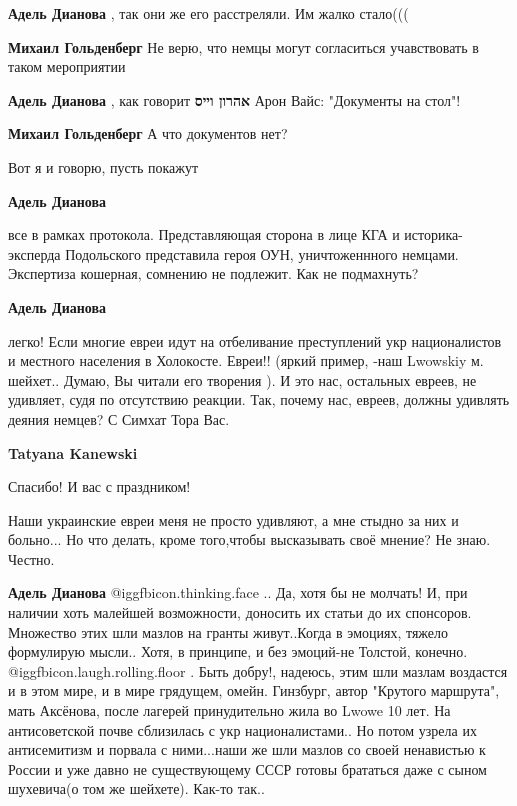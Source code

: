 \begin{itemize}
\begin{itemize} %
\textbf{Адель Дианова} , так они же его расстреляли. Им жалко стало(((

\textbf{Михаил Гольденберг} Не верю, что немцы могут согласиться учавствовать в таком мероприятии

\textbf{Адель Дианова} , как говорит \textbf{אהרון וייס} Арон Вайс: "Документы на стол"!

\textbf{Михаил Гольденберг} А что документов нет?

Вот я и говорю, пусть покажут


\textbf{Адель Дианова} 

все в рамках протокола. Представляющая сторона в лице КГА и историка-эксперда
Подольского представила героя ОУН, уничтоженнного немцами. Экспертиза кошерная,
сомнению не подлежит. Как не подмахнуть?

\textbf{Адель Дианова} 

легко! Если многие евреи идут на отбеливание преступлений укр националистов и
местного населения в Холокосте. Евреи!! (яркий пример, -наш Lwowskiy м.
шейхет.. Думаю, Вы читали его творения ). И это нас, остальных евреев, не
удивляет, судя по отсутствию реакции. Так, почему нас, евреев, должны удивлять
деяния немцев? С Симхат Тора Вас.


\textbf{Tatyana Kanewski} 

Спасибо! И вас с праздником!

Наши украинские евреи меня не просто удивляют, а мне стыдно за них и больно...
Но что делать, кроме того,чтобы высказывать своё мнение? Не знаю. Честно.

\textbf{Адель Дианова}  @igg{fbicon.thinking.face} .. Да, хотя бы не молчать! И, при наличии хоть малейшей возможности, доносить их статьи до их спонсоров. Множество этих шли мазлов на гранты живут..Когда в эмоциях, тяжело формулирую мысли.. Хотя, в принципе, и без эмоций-не Толстой, конечно.  @igg{fbicon.laugh.rolling.floor} . Быть добру!, надеюсь, этим шли мазлам воздастся и в этом мире, и в мире грядущем, омейн. Гинзбург, автор "Крутого маршрута", мать Аксёнова, после лагерей принудительно жила во Lwowe 10 лет. На антисоветской почве сблизилась с укр националистами.. Но потом узрела их антисемитизм и порвала с ними...наши же шли мазлов со своей ненавистью к России и уже давно не существующему СССР готовы брататься даже с сыном шухевича(о том же шейхете). Как-то так..


\end{itemize}
\end{itemize}
